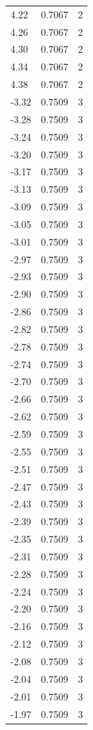 \begin{longtable}{lrr}
  4.22 & 0.7067 & 2 \\
  4.26 & 0.7067 & 2 \\
  4.30 & 0.7067 & 2 \\
  4.34 & 0.7067 & 2 \\
  4.38 & 0.7067 & 2 \\
  -3.32 & 0.7509 & 3 \\
  -3.28 & 0.7509 & 3 \\
  -3.24 & 0.7509 & 3 \\
  -3.20 & 0.7509 & 3 \\
  -3.17 & 0.7509 & 3 \\
  -3.13 & 0.7509 & 3 \\
  -3.09 & 0.7509 & 3 \\
  -3.05 & 0.7509 & 3 \\
  -3.01 & 0.7509 & 3 \\
  -2.97 & 0.7509 & 3 \\
  -2.93 & 0.7509 & 3 \\
  -2.90 & 0.7509 & 3 \\
  -2.86 & 0.7509 & 3 \\
  -2.82 & 0.7509 & 3 \\
  -2.78 & 0.7509 & 3 \\
  -2.74 & 0.7509 & 3 \\
  -2.70 & 0.7509 & 3 \\
  -2.66 & 0.7509 & 3 \\
  -2.62 & 0.7509 & 3 \\
  -2.59 & 0.7509 & 3 \\
  -2.55 & 0.7509 & 3 \\
  -2.51 & 0.7509 & 3 \\
  -2.47 & 0.7509 & 3 \\
  -2.43 & 0.7509 & 3 \\
  -2.39 & 0.7509 & 3 \\
  -2.35 & 0.7509 & 3 \\
  -2.31 & 0.7509 & 3 \\
  -2.28 & 0.7509 & 3 \\
  -2.24 & 0.7509 & 3 \\
  -2.20 & 0.7509 & 3 \\
  -2.16 & 0.7509 & 3 \\
  -2.12 & 0.7509 & 3 \\
  -2.08 & 0.7509 & 3 \\
  -2.04 & 0.7509 & 3 \\
  -2.01 & 0.7509 & 3 \\
  -1.97 & 0.7509 & 3 \\

\end{longtable}
